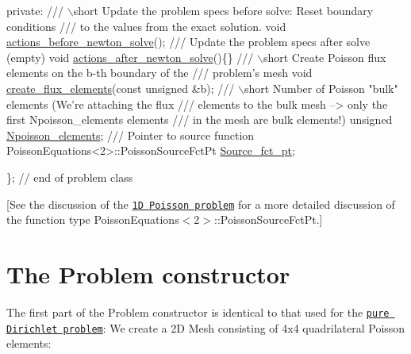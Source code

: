 \begin{DoxyCodeInclude}
\textcolor{keyword}{private}:
\textcolor{comment}{}
\textcolor{comment}{ /// \(\backslash\)short Update the problem specs before solve: Reset boundary conditions}
\textcolor{comment}{ /// to the values from the exact solution.}
\textcolor{comment}{} \textcolor{keywordtype}{void} \hyperlink{classFluxPoissonProblem_aaea8f7f6f7a2e1aedfd2854e1ae12338}{actions\_before\_newton\_solve}();
\textcolor{comment}{}
\textcolor{comment}{ /// Update the problem specs after solve (empty)}
\textcolor{comment}{} \textcolor{keywordtype}{void} \hyperlink{classFluxPoissonProblem_aa52ae9abbe805520a697929ab115f114}{actions\_after\_newton\_solve}()\{\}
\textcolor{comment}{}
\textcolor{comment}{ /// \(\backslash\)short Create Poisson flux elements on the b-th boundary of the }
\textcolor{comment}{ /// problem's mesh}
\textcolor{comment}{} \textcolor{keywordtype}{void} \hyperlink{classFluxPoissonProblem_a542ce9cc1c4e17eae68d51d2e13ac0c3}{create\_flux\_elements}(\textcolor{keyword}{const} \textcolor{keywordtype}{unsigned} &b);
\textcolor{comment}{}
\textcolor{comment}{ /// \(\backslash\)short Number of Poisson "bulk" elements (We're attaching the flux }
\textcolor{comment}{ /// elements to the bulk mesh --> only the first Npoisson\_elements elements}
\textcolor{comment}{ /// in the mesh are bulk elements!)}
\textcolor{comment}{} \textcolor{keywordtype}{unsigned} \hyperlink{classFluxPoissonProblem_a1ee0cfcbc307252430a3a5ba7ab7fd6e}{Npoisson\_elements};
\textcolor{comment}{}
\textcolor{comment}{ /// Pointer to source function}
\textcolor{comment}{} PoissonEquations<2>::PoissonSourceFctPt \hyperlink{classFluxPoissonProblem_ad003b34801b1c58b762bec0fe00b86aa}{Source\_fct\_pt};

\}; \textcolor{comment}{// end of problem class}

\end{DoxyCodeInclude}


\mbox{[}See the discussion of the \href{../../../poisson/one_d_poisson/html/index.html}{\tt 1D Poisson problem} for a more detailed discussion of the function type Poisson\+Equations$<$2$>$\+::\+Poisson\+Source\+Fct\+Pt.\mbox{]}



 

\hypertarget{index_constructor}{}\section{The Problem constructor}\label{index_constructor}
The first part of the {\ttfamily Problem} constructor is identical to that used for the \href{../../../poisson/two_d_poisson/html/index.html}{\tt pure Dirichlet problem}\+: We create a 2D Mesh consisting of 4x4 quadrilateral Poisson elements\+:


